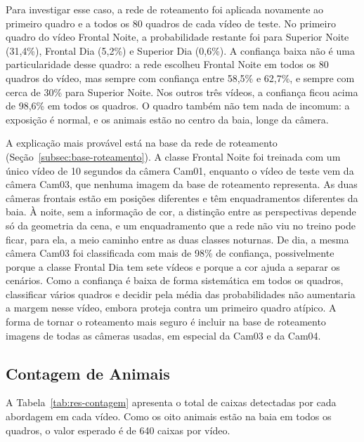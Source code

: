Para investigar esse caso, a rede de roteamento foi aplicada novamente ao primeiro quadro e a todos os 80 quadros de cada vídeo de teste. No primeiro quadro do vídeo Frontal Noite, a probabilidade restante foi para Superior Noite (31,4\%), Frontal Dia (5,2\%) e Superior Dia (0,6\%). A confiança baixa não é uma particularidade desse quadro: a rede escolheu Frontal Noite em todos os 80 quadros do vídeo, mas sempre com confiança entre 58,5\% e 62,7\%, e sempre com cerca de 30\% para Superior Noite. Nos outros três vídeos, a confiança ficou acima de 98,6\% em todos os quadros. O quadro também não tem nada de incomum: a exposição é normal, e os animais estão no centro da baia, longe da câmera.

A explicação mais provável está na base da rede de roteamento (Seção~\ref{subsec:base-roteamento}). A classe Frontal Noite foi treinada com um único vídeo de 10 segundos da câmera Cam01, enquanto o vídeo de teste vem da câmera Cam03, que nenhuma imagem da base de roteamento representa. As duas câmeras frontais estão em posições diferentes e têm enquadramentos diferentes da baia. À noite, sem a informação de cor, a distinção entre as perspectivas depende só da geometria da cena, e um enquadramento que a rede não viu no treino pode ficar, para ela, a meio caminho entre as duas classes noturnas. De dia, a mesma câmera Cam03 foi classificada com mais de 98\% de confiança, possivelmente porque a classe Frontal Dia tem sete vídeos e porque a cor ajuda a separar os cenários. Como a confiança é baixa de forma sistemática em todos os quadros, classificar vários quadros e decidir pela média das probabilidades não aumentaria a margem nesse vídeo, embora proteja contra um primeiro quadro atípico. A forma de tornar o roteamento mais seguro é incluir na base de roteamento imagens de todas as câmeras usadas, em especial da Cam03 e da Cam04.

\subsection{Contagem de Animais}
\label{subsec:res-contagem}

A Tabela~\ref{tab:res-contagem} apresenta o total de caixas detectadas por cada abordagem em cada vídeo. Como os oito animais estão na baia em todos os quadros, o valor esperado é de 640 caixas por vídeo.


